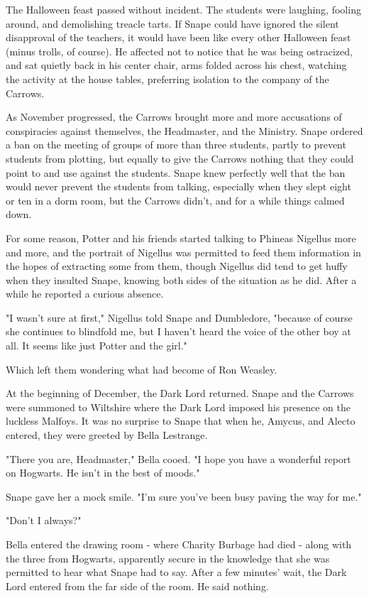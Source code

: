 The Halloween feast passed without incident. The students were laughing, fooling around, and demolishing treacle tarts. If Snape could have ignored the silent disapproval of the teachers, it would have been like every other Halloween feast (minus trolls, of course). He affected not to notice that he was being ostracized, and sat quietly back in his center chair, arms folded across his chest, watching the activity at the house tables, preferring isolation to the company of the Carrows.

As November progressed, the Carrows brought more and more accusations of conspiracies against themselves, the Headmaster, and the Ministry. Snape ordered a ban on the meeting of groups of more than three students, partly to prevent students from plotting, but equally to give the Carrows nothing that they could point to and use against the students. Snape knew perfectly well that the ban would never prevent the students from talking, especially when they slept eight or ten in a dorm room, but the Carrows didn't, and for a while things calmed down.

For some reason, Potter and his friends started talking to Phineas Nigellus more and more, and the portrait of Nigellus was permitted to feed them information in the hopes of extracting some from them, though Nigellus did tend to get huffy when they insulted Snape, knowing both sides of the situation as he did. After a while he reported a curious absence.

"I wasn't sure at first," Nigellus told Snape and Dumbledore, "because of course she continues to blindfold me, but I haven't heard the voice of the other boy at all. It seems like just Potter and the girl."

Which left them wondering what had become of Ron Weasley.

At the beginning of December, the Dark Lord returned. Snape and the Carrows were summoned to Wiltshire where the Dark Lord imposed his presence on the luckless Malfoys. It was no surprise to Snape that when he, Amycus, and Alecto entered, they were greeted by Bella Lestrange.

"There you are, Headmaster," Bella cooed. "I hope you have a wonderful report on Hogwarts. He isn't in the best of moods."

Snape gave her a mock smile. "I'm sure you've been busy paving the way for me."

"Don't I always?"

Bella entered the drawing room - where Charity Burbage had died - along with the three from Hogwarts, apparently secure in the knowledge that she was permitted to hear what Snape had to say. After a few minutes' wait, the Dark Lord entered from the far side of the room. He said nothing.

